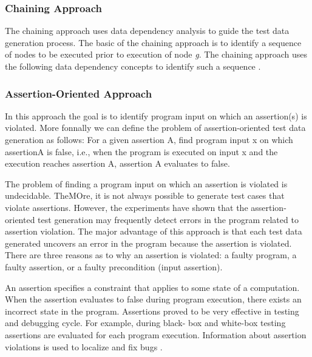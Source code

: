 \subsubsection{Chaining Approach}
The chaining approach uses data dependency analysis to guide the test data generation process. The basic of the chaining approach is to identify a sequence of nodes to be executed prior to execution of node {\it {g}}. The chaining approach uses the following data dependency concepts to identify such a sequence \cite{ferguson1996chaining}.

\subsubsection{Assertion-Oriented Approach}
In this approach the goal is to identify program input on which an assertion(s) is violated. More fonnally we can define the problem of assertion-oriented test data generation as follows: For a given assertion A, find program input x on which assertionA is false, i.e., when the program is executed on input x and the execution reaches assertion A, assertion A evaluates to false.

The problem of finding a program input on which an assertion is violated is undecidable. TheMOre, it is not always possible to generate test cases that violate assertions. However, the experiments have shown that the assertion-oriented test generation may frequently detect errors in the program related to assertion violation. The major advantage of this approach is that each test data generated uncovers an error in the program because the assertion is violated. There are three reasons as to why an assertion is violated: a faulty program, a faulty assertion, or a faulty precondition (input assertion).

An assertion specifies a constraint that applies to some state of a computation. When the assertion evaluates to false during program execution, there exists an incorrect state in the program. Assertions proved to be very effective in testing and debugging cycle. For example, during black- box and white-box testing assertions are evaluated for each program execution. Information about assertion violations is used to localize and fix bugs \cite{korel1996assertion}.




